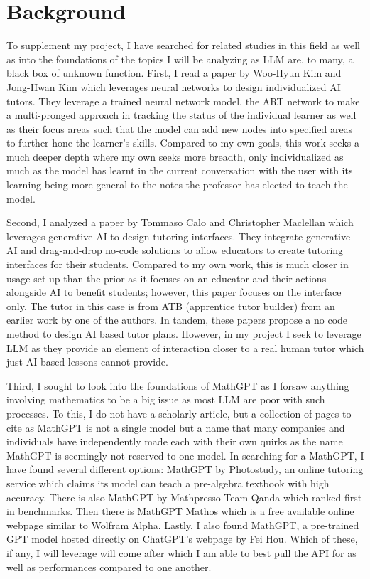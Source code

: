 \documentclass[sigconf,natbib=false]{acmart}
\begin{document}
\section{Background}
To supplement my project, I have searched for related studies in this field as well as into the foundations of the topics I will be analyzing as LLM are, to many, a black box of unknown function.
First, I read a paper by Woo-Hyun Kim and Jong-Hwan Kim which leverages neural networks to design individualized AI tutors. They leverage a trained neural network model, the ART network to make a multi-pronged approach in tracking the status of the individual learner as well as their focus areas such that the model can add new nodes into specified areas to further hone the learner's skills. Compared to my own goals, this work seeks a much deeper depth where my own seeks more breadth, only individualized as much as the model has learnt in the current conversation with the user with its learning being more general to the notes the professor has elected to teach the model.

Second, I analyzed a paper by Tommaso Calo and Christopher Maclellan which leverages generative AI to design tutoring interfaces. They integrate generative AI and drag-and-drop no-code solutions to allow educators to create tutoring interfaces for their students. Compared to my own work, this is much closer in usage set-up than the prior as it focuses on an educator and their actions alongside AI to benefit students; however, this paper focuses on the interface only. The tutor in this case is from ATB (apprentice tutor builder) from an earlier work by one of the authors. In tandem, these papers propose a no code method to design AI based tutor plans. However, in my project I seek to leverage LLM as they provide an element of interaction closer to a real human tutor which just AI based lessons cannot provide.

Third, I sought to look into the foundations of MathGPT as I forsaw anything involving mathematics to be a big issue as most LLM are poor with such processes. To this, I do not have a scholarly article, but a collection of pages to cite as MathGPT is not a single model but a name that many companies and individuals have independently made each with their own quirks as the name MathGPT is seemingly not reserved to one model. In searching for a MathGPT, I have found several different options: MathGPT by Photostudy, an online tutoring service which claims its model can teach a pre-algebra textbook with high accuracy. There is also MathGPT by Mathpresso-Team Qanda which ranked first in benchmarks. Then there is MathGPT Mathos which is a free available online webpage similar to Wolfram Alpha. Lastly, I also found MathGPT, a pre-trained GPT model hosted directly on ChatGPT's webpage by Fei Hou. Which of these, if any, I will leverage will come after which I am able to best pull the API for as well as performances compared to one another.
\end{document}
